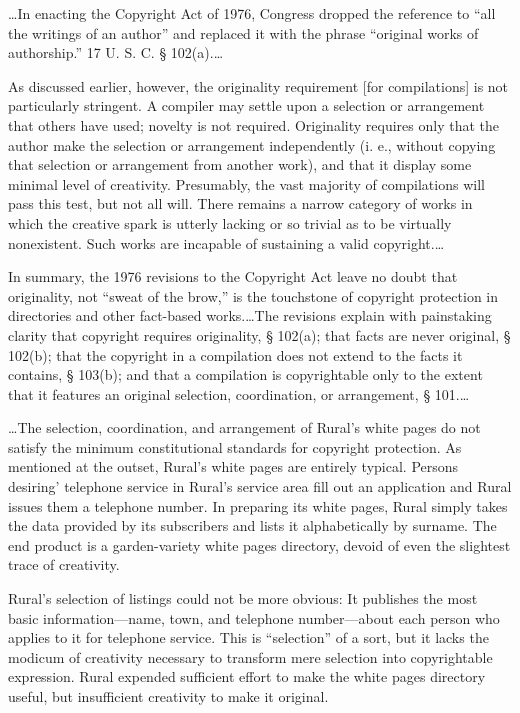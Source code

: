 
\dots In enacting the Copyright Act of 1976, Congress dropped the reference to
``all the writings of an author'' and replaced it with the phrase ``original
works of authorship.'' 17 U. S. C. {\S} 102(a).\ldots

As discussed earlier, however, the originality requirement [for compilations] is
not particularly stringent. A compiler may settle upon a selection or
arrangement that others have used; novelty is not required. Originality
requires only that the author make the selection or arrangement independently
(i. e., without copying that selection or arrangement from another work), and
that it display some minimal level of creativity. Presumably, the vast majority
of compilations will pass this test, but not all will. There remains a narrow
category of works in which the creative spark is utterly lacking or so trivial
as to be virtually nonexistent. Such works are incapable of sustaining a valid
copyright.\ldots

In summary, the 1976 revisions to the Copyright Act leave no doubt that
originality, not ``sweat of the brow,'' is the touchstone of copyright
protection in directories and other fact-based works.\ldots The revisions
explain with painstaking clarity that copyright requires originality, {\S}
102(a); that facts are never original, {\S} 102(b); that the copyright in a
compilation does not extend to the facts it contains, {\S} 103(b); and that a
compilation is copyrightable only to the extent that it features an original
selection, coordination, or arrangement, {\S} 101.\ldots


\ldots The selection, coordination, and arrangement of Rural's white pages do
not
satisfy the minimum constitutional standards for copyright protection. As
mentioned at the outset, Rural's white pages are entirely typical. Persons
desiring' telephone service in Rural's service area fill out an application and
Rural issues them a telephone number. In preparing its white pages, Rural
simply takes the data provided by its subscribers and lists it alphabetically
by surname. The end product is a garden-variety white pages directory, devoid
of even the slightest trace of creativity.

Rural's selection of listings could not be more obvious: It publishes the most
basic information---name, town, and telephone number---about each person who
applies to it for telephone service. This is ``selection'' of a sort, but it
lacks the modicum of creativity necessary to transform mere selection into
copyrightable expression. Rural expended sufficient effort to make the white
pages directory useful, but insufficient creativity to make it original.

